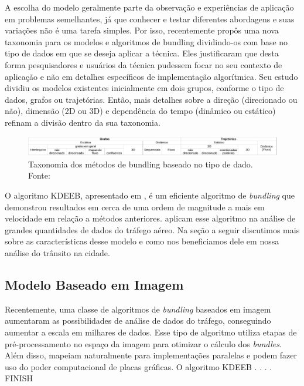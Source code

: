   A escolha do modelo geralmente parte da observação e experiências de
aplicação em problemas semelhantes, já que conhecer e testar diferentes
abordagens e suas variações não é uma tarefa simples. Por isso,
\citet{Lhuillier2017} recentemente propôs uma nova taxonomia para os modelos e
algoritmos de bundling dividindo-os com base no tipo de dados em que se deseja
aplicar a técnica. Eles justificaram que desta forma pesquisadores e usuários
da técnica pudessem focar no seu contexto de aplicação e não em detalhes
específicos de implementação algorítmica. Seu estudo dividiu os modelos
existentes inicialmente em dois grupos, conforme o tipo de dados, grafos ou
trajetórias. Então, mais detalhes sobre a direção (direcionado ou não),
dimensão (2D ou 3D) e dependência do tempo (dinâmico ou estático) refinam a
divisão dentro da sua taxonomia. 

\begin{figure}[!htb]
  \centering
  \includegraphics[width=160mm]{../figuras/estado-da-arte-crop.pdf}
  \caption{Taxonomia dos métodos de bundling baseado no tipo de dado. Fonte: \citet{Lhuillier2017}}
  \label{table:bundling-methods}
\end{figure}

 O algoritmo KDEEB, apresentado em \citet{Hurter2012}, é um eficiente algoritmo
de \emph{bundling} que demonstrou resultados em cerca de uma ordem de magnitude
a mais em velocidade em relação a métodos anteriores. \citet{Klein2013} aplicam
esse algoritmo na análise de grandes quantidades de dados do tráfego aéreo. Na
seção a seguir discutimos mais sobre as características desse modelo e como
nos beneficiamos dele em nossa análise do trânsito na cidade.

\subsection{Modelo Baseado em Imagem}

  Recentemente, uma classe de algoritmos de \emph{bundling} baseados em imagem
aumentaram as possibilidades de análise de dados do tráfego, conseguindo aumentar
a escala em milhares de dados. Esse tipo de algoritmo utiliza etapas de pré-processamento
no espaço da imagem para otimizar o cálculo dos \emph{bundles}. Além disso,
mapeiam naturalmente para implementações paralelas e podem fazer uso do poder
computacional de placas gráficas. O algoritmo KDEEB . . . . FINISH

